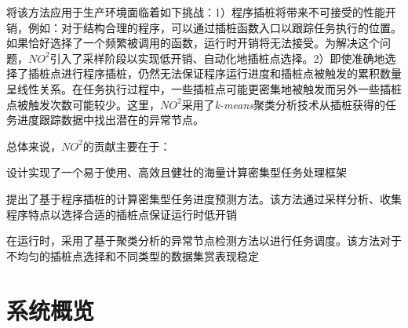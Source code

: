 将该方法应用于生产环境面临着如下挑战：1）程序插桩将带来不可接受的性能开销，例如：对于结构合理的程序，可以通过插桩函数入口以跟踪任务执行的位置。如果恰好选择了一个频繁被调用的函数，运行时开销将无法接受。为解决这个问题，$NO^2$引入了采样阶段以实现低开销、自动化地插桩点选择。2）即使准确地选择了插桩点进行程序插桩，仍然无法保证程序运行进度和插桩点被触发的累积数量呈线性关系。在任务执行过程中，一些插桩点可能更密集地被触发而另外一些插桩点被触发次数可能较少。这里，$NO^2$采用了\emph{k-means}聚类分析技术从插桩获得的任务进度跟踪数据中找出潜在的异常节点。

总体来说，$NO^2$的贡献主要在于：

设计实现了一个易于使用、高效且健壮的海量计算密集型任务处理框架

提出了基于程序插桩的计算密集型任务进度预测方法。该方法通过采样分析、收集程序特点以选择合适的插桩点保证运行时低开销

在运行时，采用了基于聚类分析的异常节点检测方法以进行任务调度。该方法对于不均匀的插桩点选择和不同类型的数据集赏表现稳定

\section{系统概览}
\label{sec:jupiter_overview}
